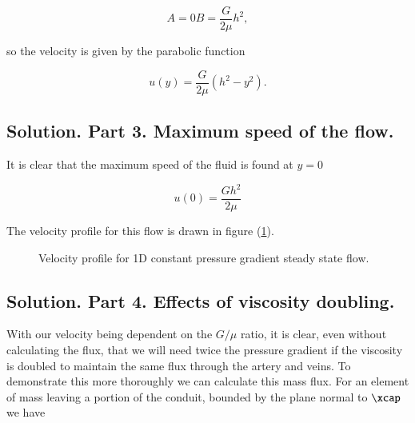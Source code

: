 \begin{subequations}
\begin{equation}\label{eqn:continuumProblemSet2:280}
A = 0 
\end{equation}
\begin{equation}\label{eqn:continuumProblemSet2:300}
B = \frac{G}{2 \mu} h^2,
\end{equation}
\end{subequations}

so the velocity is given by the parabolic function

\begin{equation}\label{eqn:continuumProblemSet2:220}
u(y) = \frac{G}{2 \mu} \left( h^2 - y^2 \right).
\end{equation}

\subsection{Solution.  Part 3.  Maximum speed of the flow.}

It is clear that the maximum speed of the fluid is found at $y = 0$

\begin{equation}\label{eqn:continuumProblemSet2:240}
u(0) = \frac{G h^2}{2 \mu}
\end{equation}

The velocity profile for this flow is drawn in figure (\ref{fig:continuumProblemSet2:continuumProblemSet2Fig1}).

\begin{figure}[htp]
   \centering
   \def\svgwidth{0.3\columnwidth}
   
   \caption{Velocity profile for 1D constant pressure gradient steady state flow.}\label{fig:continuumProblemSet2:continuumProblemSet2Fig1}
\end{figure}

\subsection{Solution.  Part 4.  Effects of viscosity doubling.}

With our velocity being dependent on the $G/\mu$ ratio, it is clear, even without calculating the flux, that we will need  twice the pressure gradient if the viscosity is doubled to maintain the same flux through the artery and veins.  To demonstrate this more thoroughly we can calculate this mass flux.  For an element of mass leaving a portion of the conduit, bounded by the plane normal to $\xcap$ we have

